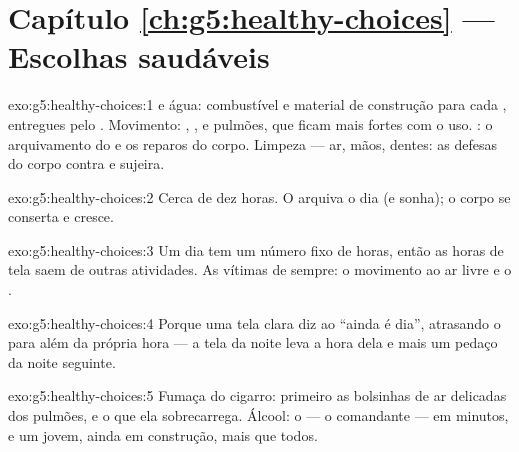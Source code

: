 \section*{Capítulo \ref{ch:g5:healthy-choices} --- Escolhas saudáveis}

\begin{solution}{exo:g5:healthy-choices:1}
 e água: combustível e material de construção para
cada , entregues pelo . Movimento: , ,
 e pulmões, que ficam mais fortes com o uso. : o
arquivamento do  e os reparos do corpo. Limpeza --- ar, mãos,
dentes: as defesas do corpo contra  e sujeira.
\end{solution}

\begin{solution}{exo:g5:healthy-choices:2}
Cerca de dez horas. O  arquiva o dia (e sonha); o corpo se
conserta e cresce.
\end{solution}

\begin{solution}{exo:g5:healthy-choices:3}
Um dia tem um número fixo de horas, então as horas de tela saem de
outras atividades. As vítimas de sempre: o movimento ao ar livre e o
.
\end{solution}

\begin{solution}{exo:g5:healthy-choices:4}
Porque uma tela clara diz ao  ``ainda é dia'', atrasando o
 para além da própria hora --- a tela da noite leva a hora dela e
mais um pedaço da noite seguinte.
\end{solution}

\begin{solution}{exo:g5:healthy-choices:5}
Fumaça do cigarro: primeiro as bolsinhas de ar delicadas dos pulmões,
e o  que ela sobrecarrega. Álcool: o  --- o comandante
--- em minutos, e um  jovem, ainda em construção, mais que
todos.
\end{solution}

